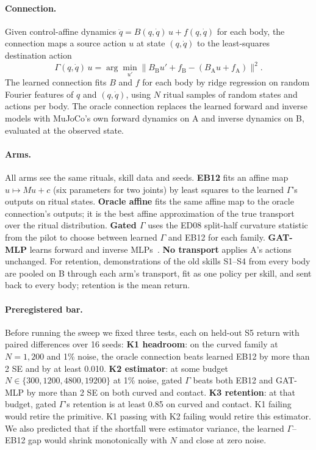 \documentclass[11pt]{article}
\begin{document}
\paragraph{Connection.}
Given control-affine dynamics \(\ddot q = B(q,\dot q)\,u + f(q,\dot q)\) for each body, the connection maps a source action \(u\) at state \((q,\dot q)\) to the least-squares destination action
\begin{equation}
  \Gamma(q,\dot q)\,u = \arg\min_{u'} \big\| B_{\mathrm B}u' + f_{\mathrm B} - (B_{\mathrm A}u + f_{\mathrm A})\big\|^2 .
  \label{eq:gamma}
\end{equation}
The learned connection fits \(B\) and \(f\) for each body by ridge regression on random Fourier features of \(q\) and \((q,\dot q)\), using \(N\) ritual samples of random states and actions per body. The oracle connection replaces the learned forward and inverse models with MuJoCo's own forward dynamics on A and inverse dynamics on B, evaluated at the observed state.

\paragraph{Arms.}
All arms see the same rituals, skill data and seeds. \textbf{EB12} fits an affine map \(u\mapsto Mu+c\) (six parameters for two joints) by least squares to the learned \(\Gamma\)'s outputs on ritual states. \textbf{Oracle affine} fits the same affine map to the oracle connection's outputs; it is the best affine approximation of the true transport over the ritual distribution. \textbf{Gated \(\Gamma\)} uses the ED08 split-half curvature statistic from the pilot to choose between learned \(\Gamma\) and EB12 for each family. \textbf{GAT-MLP} learns forward and inverse MLPs~\citep{hanna2017gat,christiano2016transfer}. \textbf{No transport} applies A's actions unchanged. For retention, demonstrations of the old skills S1--S4 from every body are pooled on B through each arm's transport, fit as one policy per skill, and sent back to every body; retention is the mean return.

\paragraph{Preregistered bar.}
Before running the sweep we fixed three tests, each on held-out S5 return with paired differences over 16 seeds:
\textbf{K1 headroom}: on the curved family at \(N=1{,}200\) and 1\% noise, the oracle connection beats learned EB12 by more than 2 SE and by at least 0.010.
\textbf{K2 estimator}: at some budget \(N\in\{300,1200,4800,19200\}\) at 1\% noise, gated \(\Gamma\) beats both EB12 and GAT-MLP by more than 2 SE on both curved and contact.
\textbf{K3 retention}: at that budget, gated \(\Gamma\)'s retention is at least 0.85 on curved and contact.
K1 failing would retire the primitive. K1 passing with K2 failing would retire this estimator. We also predicted that if the shortfall were estimator variance, the learned \(\Gamma\)--EB12 gap would shrink monotonically with \(N\) and close at zero noise.
\end{document}
